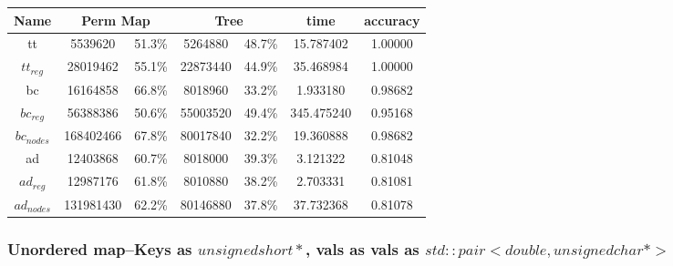 \documentclass[]{article}
\begin{document}
\begin{center}
\begin{tabular} { |c|c|c|c|c|c|c| }
\hline
Name & \multicolumn{2}{c|}{Perm Map} & \multicolumn{2}{c|}{Tree} & time & accuracy \\
\hline

tt & 5539620 & 51.3\%  & 5264880 & 48.7\% & 15.787402 & 1.00000 \\

$tt_{reg}$ & 28019462 & 55.1\% & 22873440 & 44.9\% & 35.468984 & 1.00000 \\

bc & 16164858 & 66.8\% & 8018960 & 33.2\% & 1.933180 & 0.98682 \\

$bc_{reg}$ & 56388386 & 50.6\% & 55003520 & 49.4\% & 345.475240 & 0.95168 \\

$bc_{nodes}$ & 168402466 & 67.8\% & 80017840 & 32.2\% & 19.360888 & 0.98682 \\

ad & 12403868 & 60.7\% & 8018000 & 39.3\% & 3.121322 & 0.81048 \\

$ad_{reg}$ & 12987176 & 61.8\% & 8010880 & 38.2\% & 2.703331 & 0.81081 \\

$ad_{nodes}$ & 131981430 & 62.2\% & 80146880 & 37.8\% & 37.732368 & 0.81078 \\
\hline
\end{tabular}
\end{center}

\subsubsection{Unordered map--Keys as $unsigned short *$, vals as vals as $std::pair<double, unsigned char*>$}
\end{document}
